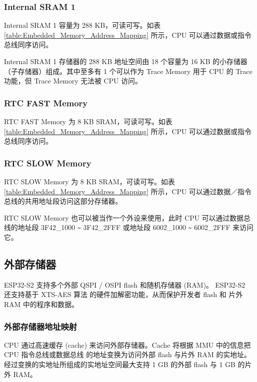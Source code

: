 \documentclass[main\_\_CN.tex]{subfiles}
\begin{document}
\subsubsection{Internal SRAM 1}

Internal SRAM 1 容量为 288 KB，可读可写。如表 \ref{table:Embedded_Memory_Address_Mapping} 所示，CPU 可以通过数据或指令总线同序访问。

\hypertarget{Trace}{}
Internal SRAM 1 存储器的 288 KB 地址空间由 18 个容量为 16 KB 的小存储器（子存储器）组成。其中至多有 1 个可以作为 Trace Memory 用于 CPU 的 Trace 功能，但 Trace Memory 无法被 CPU 访问。

\subsubsection{RTC FAST Memory}
\hypertarget{PRO_CPU_Only}{}
RTC FAST Memory 为 8 KB SRAM，可读可写。如表 \ref{table:Embedded_Memory_Address_Mapping} 所示，CPU 可以通过数据或指令总线同序访问。

\subsubsection{RTC SLOW Memory}

RTC SLOW Memory 为 8 KB SRAM，可读可写。如表 \ref{table:Embedded_Memory_Address_Mapping} 所示，CPU 可以通过数据／指令总线的共用地址段访问这部分存储器。

RTC SLOW Memory 也可以被当作一个外设来使用，此时 CPU 可以通过数据总线的地址段 \hexprefix{}3F42\_1000 \verb+~+ \hexprefix{}3F42\_2FFF 或地址段 \hexprefix{}6002\_1000 \verb+~+ \hexprefix{}6002\_2FFF 来访问它。








\subsection{外部存储器 } \label{para:external_Memory}

ESP32-S2 支持多个外部 QSPI / OSPI flash 和随机存储器 (RAM)。
ESP32-S2 还支持基于 XTS-AES 算法 的硬件加解密功能，从而保护开发者 flash 和 片外 RAM 中的程序和数据。

\subsubsection{外部存储器地址映射}

CPU 通过高速缓存 (cache) 来访问外部存储器。Cache 将根据 MMU 中的信息把 CPU 指令总线或数据总线 的地址变换为访问外部 flash 与片外 RAM 的实地址。经过变换的实地址所组成的实地址空间最大支持 1 GB 的外部 flash 与 1 GB 的片外 RAM。
\end{document}
